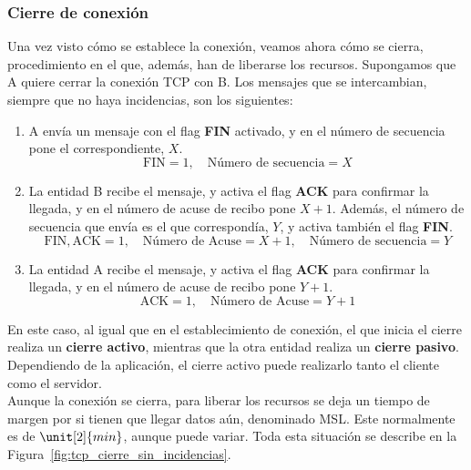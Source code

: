 \subsubsection{Cierre de conexión}
Una vez visto cómo se establece la conexión, veamos ahora cómo se cierra, procedimiento en el que, además, han de liberarse los recursos. Supongamos que A quiere cerrar la conexión \acrshort{TCP} con B. Los mensajes que se intercambian, siempre que no haya incidencias, son los siguientes:
\begin{enumerate}
    \item A envía un mensaje con el flag \textbf{FIN} activado, y en el número de secuencia pone el correspondiente, $X$.
    \begin{equation*}
        \text{FIN} = 1, \quad \text{Número de secuencia} = X
    \end{equation*}
    \item La entidad B recibe el mensaje, y activa el flag \textbf{ACK} para confirmar la llegada, y en el número de acuse de recibo pone $X+1$. Además, el número de secuencia que envía es el que correspondía, $Y$, y activa también el flag \textbf{FIN}.
    \begin{equation*}
        \text{FIN},\text{ACK} = 1, \quad \text{Número de Acuse} = X+1,\quad \text{Número de secuencia} = Y
    \end{equation*}
    \item La entidad A recibe el mensaje, y activa el flag \textbf{ACK} para confirmar la llegada, y en el número de acuse de recibo pone $Y+1$.
    \begin{equation*}
        \text{ACK} = 1, \quad \text{Número de Acuse} = Y+1
    \end{equation*}
\end{enumerate}

En este caso, al igual que en el establecimiento de conexión, el que inicia el cierre realiza un \textbf{cierre activo}, mientras que la otra entidad realiza un \textbf{cierre pasivo}. Dependiendo de la aplicación, el cierre activo puede realizarlo tanto el cliente como el servidor.\\

Aunque la conexión se cierra, para liberar los recursos se deja un tiempo de margen por si tienen que llegar datos aún, denominado \acrfull{MSL}. Este normalmente es de $\unit[2]{min}$, aunque puede variar. Toda esta situación se describe en la Figura~\ref{fig:tcp_cierre_sin_incidencias}.


